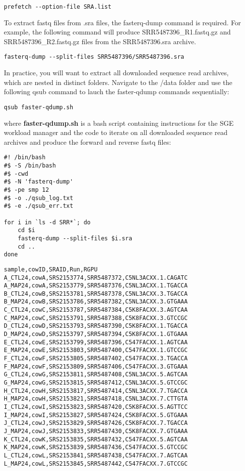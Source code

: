 \begin{verbatim}
prefetch --option-file SRA.list
\end{verbatim}

To extract fastq files from .sra files, the fasterq-dump command is required. For example, the following command will produce SRR5487396\_R1.fastq.gz and SRR5487396\_R2.fastq.gz files from the SRR5487396.sra archive.

\begin{verbatim}
fasterq-dump --split-files SRR5487396/SRR5487396.sra
\end{verbatim}

In practice, you will want to extract all downloaded sequence read archives, which are nested in distinct folders. Navigate to the /data folder and use the following qsub command to lauch the faster-qdump commands sequentially:

\begin{verbatim}
qsub faster-qdump.sh
\end{verbatim}

where \textbf{faster-qdump.sh} is a bash script containing instructions for the SGE workload manager and the code to iterate on all downloaded sequence read archives and produce the forward and reverse fastq files:

\begin{verbatim}
#! /bin/bash
#$ -S /bin/bash
#$ -cwd
#$ -N 'fasterq-dump'
#$ -pe smp 12
#$ -o ./qsub_log.txt
#$ -e ./qsub_err.txt
	
for i in `ls -d SRR*`; do
	cd $i
	fasterq-dump --split-files $i.sra
	cd ..
done
\end{verbatim}



\begin{verbatim}
sample,cowID,SRAID,Run,RGPU
A_CTL24,cowA,SRS2153774,SRR5487372,C5NL3ACXX.1.CAGATC
A_MAP24,cowA,SRS2153779,SRR5487376,C5NL3ACXX.1.TGACCA
B_CTL24,cowB,SRS2153781,SRR5487378,C5NL3ACXX.3.TGACCA
B_MAP24,cowB,SRS2153786,SRR5487382,C5NL3ACXX.3.GTGAAA
C_CTL24,cowC,SRS2153787,SRR5487384,C5K8FACXX.3.AGTCAA
C_MAP24,cowC,SRS2153791,SRR5487388,C5K8FACXX.3.GTCCGC
D_CTL24,cowD,SRS2153793,SRR5487390,C5K8FACXX.1.TGACCA
D_MAP24,cowD,SRS2153797,SRR5487394,C5K8FACXX.1.GTGAAA
E_CTL24,cowE,SRS2153799,SRR5487396,C547FACXX.1.AGTCAA
E_MAP24,cowE,SRS2153803,SRR5487400,C547FACXX.1.GTCCGC
F_CTL24,cowF,SRS2153805,SRR5487402,C547FACXX.3.TGACCA
F_MAP24,cowF,SRS2153809,SRR5487406,C547FACXX.3.GTGAAA
G_CTL24,cowG,SRS2153811,SRR5487408,C5NL3ACXX.5.AGTCAA
G_MAP24,cowG,SRS2153815,SRR5487412,C5NL3ACXX.5.GTCCGC
H_CTL24,cowH,SRS2153817,SRR5487414,C5NL3ACXX.7.TGACCA
H_MAP24,cowH,SRS2153821,SRR5487418,C5NL3ACXX.7.CTTGTA
I_CTL24,cowI,SRS2153823,SRR5487420,C5K8FACXX.5.AGTTCC
I_MAP24,cowI,SRS2153827,SRR5487424,C5K8FACXX.5.GTGAAA
J_CTL24,cowJ,SRS2153829,SRR5487426,C5K8FACXX.7.TGACCA
J_MAP24,cowJ,SRS2153833,SRR5487430,C5K8FACXX.7.GTGAAA
K_CTL24,cowK,SRS2153835,SRR5487432,C547FACXX.5.AGTCAA
K_MAP24,cowK,SRS2153839,SRR5487436,C547FACXX.5.GTCCGC
L_CTL24,cowL,SRS2153841,SRR5487438,C547FACXX.7.AGTCAA
L_MAP24,cowL,SRS2153845,SRR5487442,C547FACXX.7.GTCCGC
\end{verbatim}

